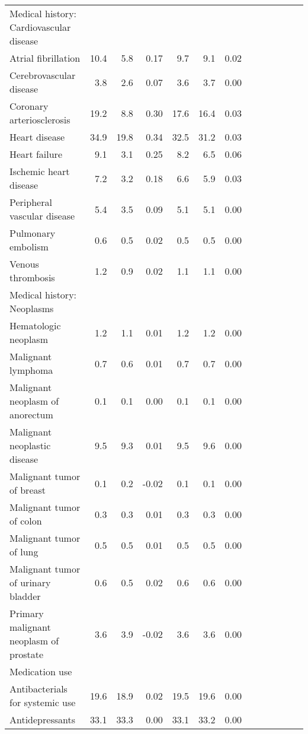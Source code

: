 \documentclass[11pt,]{article}
\begin{document}
\begin{longtable}{lrrrrrrrrrrrr}
  Medical history: Cardiovascular disease &    &    &     &    &    &     \\ 
      Atrial fibrillation & 10.4 &  5.8 &  0.17 &  9.7 &  9.1 &  0.02 \\ 
      Cerebrovascular disease &  3.8 &  2.6 &  0.07 &  3.6 &  3.7 &  0.00 \\ 
      Coronary arteriosclerosis & 19.2 &  8.8 &  0.30 & 17.6 & 16.4 &  0.03 \\ 
      Heart disease & 34.9 & 19.8 &  0.34 & 32.5 & 31.2 &  0.03 \\ 
      Heart failure &  9.1 &  3.1 &  0.25 &  8.2 &  6.5 &  0.06 \\ 
      Ischemic heart disease &  7.2 &  3.2 &  0.18 &  6.6 &  5.9 &  0.03 \\ 
      Peripheral vascular disease &  5.4 &  3.5 &  0.09 &  5.1 &  5.1 &  0.00 \\ 
      Pulmonary embolism &  0.6 &  0.5 &  0.02 &  0.5 &  0.5 &  0.00 \\ 
      Venous thrombosis &  1.2 &  0.9 &  0.02 &  1.1 &  1.1 &  0.00 \\ 
  Medical history: Neoplasms &    &    &     &    &    &     \\ 
      Hematologic neoplasm &  1.2 &  1.1 &  0.01 &  1.2 &  1.2 &  0.00 \\ 
      Malignant lymphoma &  0.7 &  0.6 &  0.01 &  0.7 &  0.7 &  0.00 \\ 
      Malignant neoplasm of anorectum &  0.1 &  0.1 &  0.00 &  0.1 &  0.1 &  0.00 \\ 
      Malignant neoplastic disease &  9.5 &  9.3 &  0.01 &  9.5 &  9.6 &  0.00 \\ 
      Malignant tumor of breast &  0.1 &  0.2 & -0.02 &  0.1 &  0.1 &  0.00 \\ 
      Malignant tumor of colon &  0.3 &  0.3 &  0.01 &  0.3 &  0.3 &  0.00 \\ 
      Malignant tumor of lung &  0.5 &  0.5 &  0.01 &  0.5 &  0.5 &  0.00 \\ 
      Malignant tumor of urinary bladder &  0.6 &  0.5 &  0.02 &  0.6 &  0.6 &  0.00 \\ 
      Primary malignant neoplasm of prostate &  3.6 &  3.9 & -0.02 &  3.6 &  3.6 &  0.00 \\ 
  Medication use &    &    &     &    &    &     \\ 
      Antibacterials for systemic use & 19.6 & 18.9 &  0.02 & 19.5 & 19.6 &  0.00 \\ 
      Antidepressants & 33.1 & 33.3 &  0.00 & 33.1 & 33.2 &  0.00 \\ 

\end{longtable}
\end{document}

